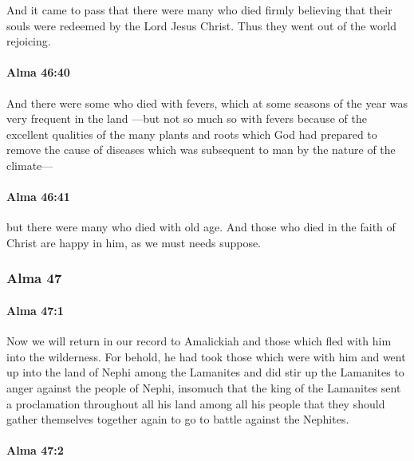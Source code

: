 			And it came to pass that there were many who died
			firmly believing that their souls were redeemed by the Lord Jesus Christ.
			Thus they went out of the world rejoicing.

		\paragraph{Alma 46:40} %
			\label{ALMA-46-40}

			And there were some who died with fevers,
			which at some seasons of the year was very frequent in the land
			---but not so much so with fevers
			because of the excellent qualities of the many plants and roots
			which God had prepared to remove the cause of diseases
			which was subsequent to man by the nature of the climate---

		\paragraph{Alma 46:41} %
			\label{ALMA-46-41}

			but there were many who died with old age.
			And those who died in the faith of Christ are happy in him,
			as we must needs suppose.

	\subsubsection{Alma 47} %
		\label{ALMA-47}
		
		\paragraph{Alma 47:1} %
			\label{ALMA-47-1}

			Now we will return in our record to Amalickiah
			and those which fled with him into the wilderness.
			For behold, he had took those which were with him
			and went up into the land of Nephi among the Lamanites
			and did stir up the Lamanites to anger against the people of Nephi,
			insomuch that the king of the Lamanites sent a proclamation
			throughout all his land among all his people
			that they should gather themselves together again
			to go to battle against the Nephites.

		\paragraph{Alma 47:2} %
			\label{ALMA-47-2}

